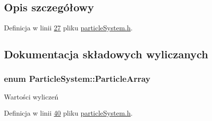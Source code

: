 \subsection{Opis szczegółowy}


Definicja w linii \hyperlink{particle_system_8h_source_l00027}{27} pliku \hyperlink{particle_system_8h_source}{particle\-System.\-h}.



\subsection{Dokumentacja składowych wyliczanych}
\hypertarget{class_particle_system_a332fbe57a36aaea5c18b4ea4fba6bbb3}{
\subsubsection[{Particle\-Array}]{\setlength{\rightskip}{0pt plus 5cm}enum {\bf Particle\-System\-::\-Particle\-Array}}}\label{class_particle_system_a332fbe57a36aaea5c18b4ea4fba6bbb3}
\begin{Desc}
\item[Wartości wyliczeń]\par
\begin{description}
\item[{\em 
\hypertarget{class_particle_system_a332fbe57a36aaea5c18b4ea4fba6bbb3a9e9a2992d230a2674debf26e0e8e0299}{P\-O\-S\-I\-T\-I\-O\-N}\label{class_particle_system_a332fbe57a36aaea5c18b4ea4fba6bbb3a9e9a2992d230a2674debf26e0e8e0299}
}]\item[{\em 
\hypertarget{class_particle_system_a332fbe57a36aaea5c18b4ea4fba6bbb3a3702de73065f01b4f6ffa604b799e53d}{V\-E\-L\-O\-C\-I\-T\-Y}\label{class_particle_system_a332fbe57a36aaea5c18b4ea4fba6bbb3a3702de73065f01b4f6ffa604b799e53d}
}]\end{description}
\end{Desc}


Definicja w linii \hyperlink{particle_system_8h_source_l00040}{40} pliku \hyperlink{particle_system_8h_source}{particle\-System.\-h}.


